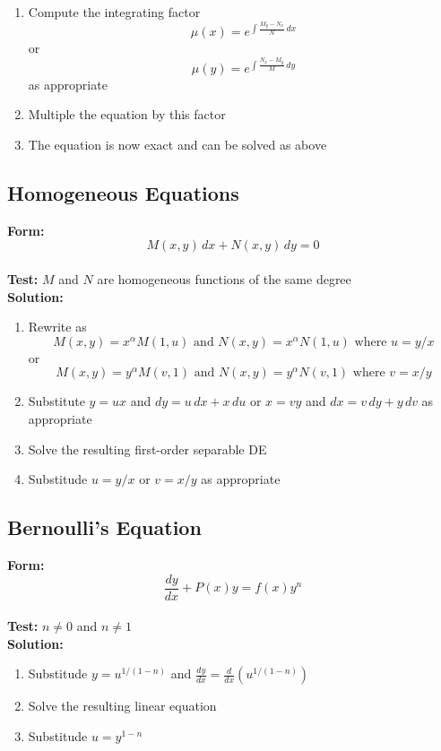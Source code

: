 \documentclass{article}
\begin{document}
\begin{enumerate}
  \item Compute the integrating factor \[\mu(x) = e^{\int \frac{M_y - N_x}{N} \,d x}\] or \[\mu(y) = e^{\int \frac{N_x - M_y}{M} \,d y}\] as appropriate

  \item Multiple the equation by this factor

  \item The equation is now exact and can be solved as above
\end{enumerate}

\subsection{Homogeneous Equations}

\textbf{Form:} \[M(x, y) \,d x + N(x, y) \,d y = 0\] \\ \textbf{Test:} $M$ and $N$ are homogeneous functions of the same degree \\ \textbf{Solution:}

\begin{enumerate}
  \item Rewrite as \[M(x, y) = x^\alpha M(1, u) \text{ and } N(x, y) = x^\alpha N(1, u) \text{ where } u = y / x\] or \[M(x, y) = y^\alpha M(v, 1) \text{ and } N(x, y) = y^\alpha N(v, 1) \text{ where } v = x / y\]

  \item Substitute $y = u x$ and $d y = u \,d x + x \,d u$ or $x = v y$ and $d x = v \,d y + y \,d v$ as appropriate

  \item Solve the resulting first-order separable DE

  \item Substitude $u = y / x$ or $v = x / y$ as appropriate
\end{enumerate}

\subsection{Bernoulli's Equation}

\textbf{Form:} \[\frac{d y}{d x} + P(x) y = f(x) y^n\] \\ \textbf{Test:} $n \ne 0$ and $n \ne 1$ \\ \textbf{Solution:}

\begin{enumerate}
  \item Substitude $y = u^{1 / (1 - n)}$ and $\frac{d y}{d x} = \frac{d}{dx} (u^{1 / (1 - n)})$

  \item Solve the resulting linear equation

  \item Substitude $u = y^{1 - n}$
\end{enumerate}
\end{document}
